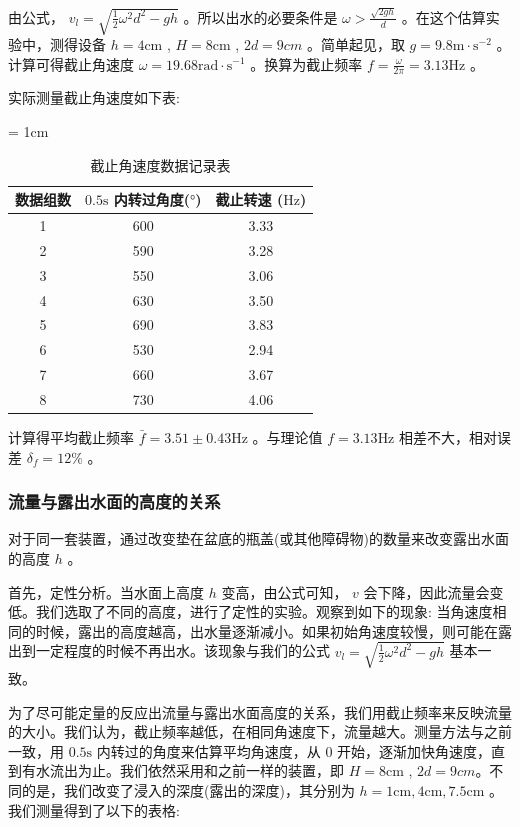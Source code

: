 \documentclass[fontset=windows]{article}
\begin{document}
由公式， $v_l = \sqrt{\frac{1}{2}\omega^2 d^2 - gh}$ 。所以出水的必要条件是 $\omega > \frac{\sqrt{2gh}}{d} $ 。在这个估算实验中，测得设备 $h = 4\text{cm}$ , $H = 8\text{cm}$ , $2d = 9cm$ 。简单起见，取 $g = 9.8 \text{m}\cdot\text{s}^{-2}$ 。计算可得截止角速度 $\omega = 19.68 \text{rad} \cdot \text{s}^{-1} $ 。换算为截止频率 $f = \frac{\omega}{2\pi} = 3.13 \text{Hz} $ 。

实际测量截止角速度如下表:

\begin{table}[htbp]
    \centering
    \caption{截止角速度数据记录表}
    \label{table1}
    \renewcommand\arraystretch{1.5}
    \tabcolsep = 1cm
    \begin{tabular}{|c|c|c|}
        \hline
        数据组数 & $0.5\text{s}$ 内转过角度($\text{°}$)  & 截止转速 ($\text{Hz}$) \\
        \hline
        1 & 600 & 3.33 \\
        \hline
        2 & 590 & 3.28 \\
        \hline
        3 & 550 & 3.06 \\ 
        \hline
        4 & 630 & 3.50 \\
        \hline
        5 & 690 & 3.83 \\
        \hline
        6 & 530 & 2.94 \\
        \hline
        7 & 660 & 3.67 \\
        \hline
        8 & 730 & 4.06 \\
        \hline
    \end{tabular}
\end{table}

计算得平均截止频率 $\bar{f} = 3.51 \pm 0.43 \text{Hz}$ 。与理论值 $f = 3.13 \text{Hz}$ 相差不大，相对误差 $\delta_f = 12\%$ 。

\subsubsection{流量与露出水面的高度的关系}

对于同一套装置，通过改变垫在盆底的瓶盖(或其他障碍物)的数量来改变露出水面的高度 $h$ 。

首先，定性分析。当水面上高度 $h$ 变高，由公式可知， $v$ 会下降，因此流量会变低。我们选取了不同的高度，进行了定性的实验。观察到如下的现象:   当角速度相同的时候，露出的高度越高，出水量逐渐减小。如果初始角速度较慢，则可能在露出到一定程度的时候不再出水。该现象与我们的公式 $v_l = \sqrt{\frac{1}{2}\omega^2 d^2 - gh} $ 基本一致。

为了尽可能定量的反应出流量与露出水面高度的关系，我们用截止频率来反映流量的大小。我们认为，截止频率越低，在相同角速度下，流量越大。测量方法与之前一致，用 $0.5\text{s}$ 内转过的角度来估算平均角速度，从 $0$ 开始，逐渐加快角速度，直到有水流出为止。我们依然采用和之前一样的装置，即 $H = 8\text{cm}$ , $2d = 9cm$。不同的是，我们改变了浸入的深度(露出的深度)，其分别为 $h = 1\text{cm}, 4\text{cm} , 7.5\text{cm}$ 。我们测量得到了以下的表格:
\end{document}
